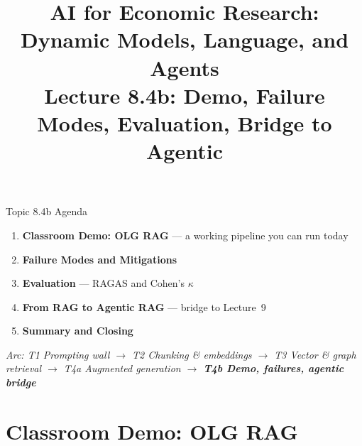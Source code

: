 


\usetikzlibrary{arrows.meta, positioning, shapes.geometric, fit, calc, backgrounds}

\graphicspath{{./pic/}{./figures/}{../../MiniCourse_8hr/Slides/Module4_Agentic_AI/pic/}{../}}

\title[AI for Econ Research]{AI for Economic Research: Dynamic Models, Language, and Agents\\
Lecture 8.4b: Demo, Failure Modes, Evaluation, Bridge to Agentic}



\makebeamertitle

\begin{frame}{Topic 8.4b Agenda}
\begin{enumerate}
  \item \textbf{Classroom Demo: OLG RAG} --- a working pipeline you can run today
  \medskip
  \item \textbf{Failure Modes and Mitigations}
  \medskip
  \item \textbf{Evaluation} --- RAGAS and Cohen's $\kappa$
  \medskip
  \item \textbf{From RAG to Agentic RAG} --- bridge to Lecture~9
  \medskip
  \item \textbf{Summary and Closing}
\end{enumerate}

\medskip
\textit{Arc: T1 Prompting wall $\to$ T2 Chunking \& embeddings $\to$ T3 Vector \& graph retrieval $\to$ T4a Augmented generation $\to$ \textbf{T4b Demo, failures, agentic bridge}}
\end{frame}


\section{Classroom Demo: OLG RAG}


